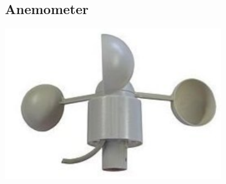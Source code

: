 \subsection{Anemometer}
\begin{minipage}{0.5\textwidth}
\blindtext
\end{minipage}
\begin{minipage}{0.49\textwidth}
\centering
\includegraphics[width=0.7\textwidth]{graphics/Anemometer/anemometer.png}
\label{fig:anemometer}
\end{minipage}

